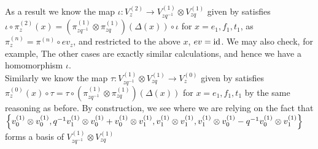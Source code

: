 \documentclass{article}
\begin{document}
As a result we know the map $\iota : V_z^{(2)} \to V_{zq^{-1}}^{(1)} \otimes V_{zq}^{(1)}$ given by 
satisfies $\iota \circ \pi^{(2)}_{z} (x) = (\pi^{(1)}_{zq^{-1}} \otimes \pi^{(1)}_{zq})(\Delta(x)) \circ \iota$ for $x = e_1, f_1, t_1$, as $\pi_z^{(n)} = \pi^{(n)} \circ  ev_z$, and restricted to the above $x$, $ev = \operatorname{id}$. We may also check, for example, 
The other cases are exactly similar calculations, and hence we have a homomorphism $\iota$. \\
Similarly we know the map $\tau  : V_{zq^{-1}}^{(1)} \otimes V_{zq}^{(1)} \to V_z^{(0)}$ given by 
satisfies $ \pi^{(0)}_{z} (x) \circ \tau = \tau \circ (\pi^{(1)}_{zq^{-1}} \otimes \pi^{(1)}_{zq})(\Delta(x))$ for $x = e_1, f_1, t_1$ by the same reasoning as before. By construction, we see
where we are relying on the fact that $\left\{ v_0^{(1)} \otimes v_0^{(1)}, q^{-1}v_1^{(1)} \otimes v_0^{(1)} + v_0^{(1)} \otimes v_1^{(1)},v_1^{(1)} \otimes v_1^{(1)},v_1^{(1)} \otimes v_0^{(1)} - q^{-1}v_0^{(1)} \otimes v_1^{(1)} \right\}$ forms a basis of $V_{zq^{-1}}^{(1)} \otimes V_{zq}^{(1)}$
\end{document}

